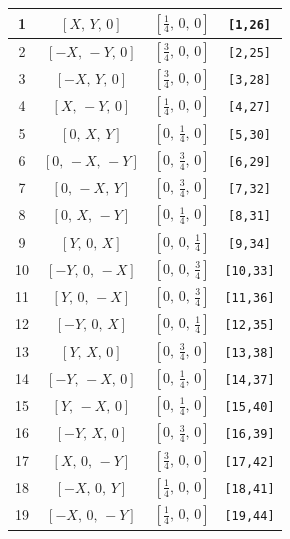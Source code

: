 \documentclass[fleqn,8pt]{jsarticle}
\begin{document}
\begin{longtable}{cccc}
1 & $\left[ X,\, Y,\, 0 \right]$ & $\left[ \frac{1}{4},\, 0,\, 0 \right]$ & {\tt [1,26]} \\ \hline
2 & $\left[ - X,\, - Y,\, 0 \right]$ & $\left[ \frac{3}{4},\, 0,\, 0 \right]$ & {\tt [2,25]} \\ \hline
3 & $\left[ - X,\, Y,\, 0 \right]$ & $\left[ \frac{3}{4},\, 0,\, 0 \right]$ & {\tt [3,28]} \\ \hline
4 & $\left[ X,\, - Y,\, 0 \right]$ & $\left[ \frac{1}{4},\, 0,\, 0 \right]$ & {\tt [4,27]} \\ \hline
5 & $\left[ 0,\, X,\, Y \right]$ & $\left[ 0,\, \frac{1}{4},\, 0 \right]$ & {\tt [5,30]} \\ \hline
6 & $\left[ 0,\, - X,\, - Y \right]$ & $\left[ 0,\, \frac{3}{4},\, 0 \right]$ & {\tt [6,29]} \\ \hline
7 & $\left[ 0,\, - X,\, Y \right]$ & $\left[ 0,\, \frac{3}{4},\, 0 \right]$ & {\tt [7,32]} \\ \hline
8 & $\left[ 0,\, X,\, - Y \right]$ & $\left[ 0,\, \frac{1}{4},\, 0 \right]$ & {\tt [8,31]} \\ \hline
9 & $\left[ Y,\, 0,\, X \right]$ & $\left[ 0,\, 0,\, \frac{1}{4} \right]$ & {\tt [9,34]} \\ \hline
10 & $\left[ - Y,\, 0,\, - X \right]$ & $\left[ 0,\, 0,\, \frac{3}{4} \right]$ & {\tt [10,33]} \\ \hline
11 & $\left[ Y,\, 0,\, - X \right]$ & $\left[ 0,\, 0,\, \frac{3}{4} \right]$ & {\tt [11,36]} \\ \hline
12 & $\left[ - Y,\, 0,\, X \right]$ & $\left[ 0,\, 0,\, \frac{1}{4} \right]$ & {\tt [12,35]} \\ \hline
13 & $\left[ Y,\, X,\, 0 \right]$ & $\left[ 0,\, \frac{3}{4},\, 0 \right]$ & {\tt [13,38]} \\ \hline
14 & $\left[ - Y,\, - X,\, 0 \right]$ & $\left[ 0,\, \frac{1}{4},\, 0 \right]$ & {\tt [14,37]} \\ \hline
15 & $\left[ Y,\, - X,\, 0 \right]$ & $\left[ 0,\, \frac{1}{4},\, 0 \right]$ & {\tt [15,40]} \\ \hline
16 & $\left[ - Y,\, X,\, 0 \right]$ & $\left[ 0,\, \frac{3}{4},\, 0 \right]$ & {\tt [16,39]} \\ \hline
17 & $\left[ X,\, 0,\, - Y \right]$ & $\left[ \frac{3}{4},\, 0,\, 0 \right]$ & {\tt [17,42]} \\ \hline
18 & $\left[ - X,\, 0,\, Y \right]$ & $\left[ \frac{1}{4},\, 0,\, 0 \right]$ & {\tt [18,41]} \\ \hline
19 & $\left[ - X,\, 0,\, - Y \right]$ & $\left[ \frac{1}{4},\, 0,\, 0 \right]$ & {\tt [19,44]} \\ \hline

\end{longtable}
\end{document}
